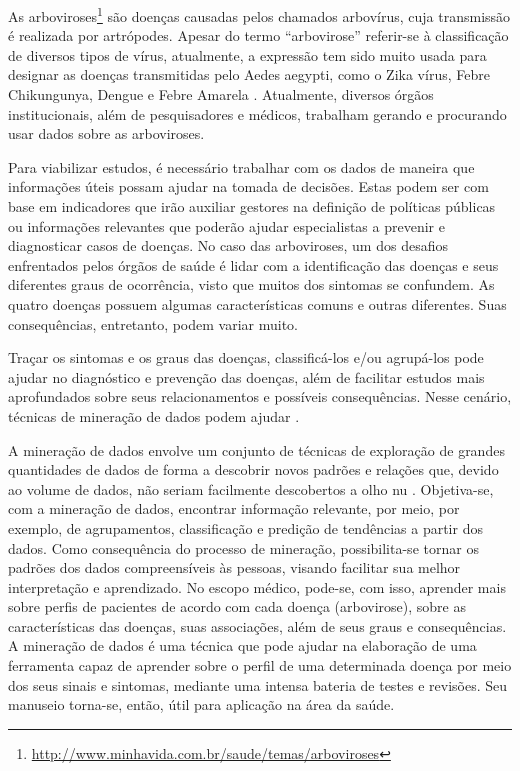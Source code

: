 As arboviroses\footnote{\url{http://www.minhavida.com.br/saude/temas/arboviroses}} são doenças causadas pelos chamados arbovírus, cuja transmissão é realizada por artrópodes. Apesar do termo “arbovirose” referir-se à classificação de diversos tipos de vírus, atualmente, a expressão tem sido muito usada para designar as doenças transmitidas pelo Aedes aegypti, como o Zika vírus, Febre Chikungunya, Dengue e Febre Amarela \cite{IOC2018,CDCP2018}. Atualmente, diversos órgãos institucionais, além de pesquisadores e médicos, trabalham gerando e procurando usar dados sobre as arboviroses.

Para viabilizar estudos, é necessário trabalhar com os dados de maneira que informações úteis possam ajudar na tomada de decisões. Estas podem ser com base em indicadores que irão auxiliar gestores na definição de políticas públicas ou informações relevantes que poderão ajudar especialistas a prevenir e diagnosticar casos de doenças. No caso das arboviroses, um dos desafios enfrentados pelos órgãos de saúde é lidar com a identificação das doenças e seus diferentes graus de ocorrência, visto que muitos dos sintomas se confundem. As quatro doenças possuem algumas características comuns e outras diferentes. Suas consequências, entretanto, podem variar muito. 

Traçar os sintomas e os graus das doenças, classificá-los e/ou agrupá-los pode ajudar no diagnóstico e prevenção das doenças, além de facilitar estudos mais aprofundados sobre seus relacionamentos e possíveis consequências.  Nesse cenário, técnicas de mineração de dados podem ajudar \cite{han2012,Witten2016}.

A mineração de dados envolve um conjunto de técnicas de exploração de grandes quantidades de dados de forma a descobrir novos padrões e relações que, devido ao volume de dados, não seriam facilmente descobertos a olho nu \cite{han2012,Witten2016}. Objetiva-se, com a mineração de dados, encontrar informação relevante, por meio, por exemplo, de agrupamentos, classificação e predição de tendências a partir dos dados. Como consequência do processo de mineração, possibilita-se tornar os padrões dos dados compreensíveis às pessoas, visando facilitar sua melhor interpretação e aprendizado. No escopo médico, pode-se, com isso, aprender mais sobre perfis de pacientes de acordo com cada doença (arbovirose), sobre as características das doenças, suas associações, além de seus graus e consequências. A mineração de dados é uma técnica que pode ajudar na elaboração de uma ferramenta capaz de aprender sobre o perfil de uma determinada doença por meio dos seus sinais e sintomas, mediante uma intensa bateria de testes e revisões. Seu manuseio torna-se, então, útil para aplicação na área da saúde.


